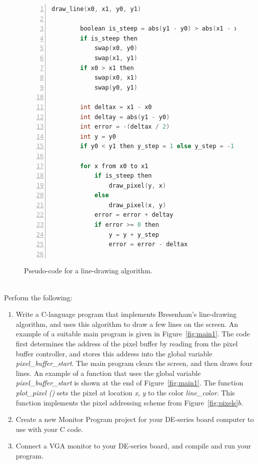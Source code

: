 \documentclass[epsfig,10pt,fullpage]{article}
\begin{document}
\begin{figure}[H]
\centering
\begin{lstlisting}[language=C, numbers=left, stepnumber=1, xleftmargin=1cm,
morekeywords={then}]
  draw_line(x0, x1, y0, y1)
		
		boolean is_steep = abs(y1 - y0) > abs(x1 - x0)
		if is_steep then
			swap(x0, y0)
			swap(x1, y1)
		if x0 > x1 then
			swap(x0, x1)
			swap(y0, y1)
			
		int deltax = x1 - x0
		int deltay = abs(y1 - y0)
		int error = -(deltax / 2)
		int y = y0
		if y0 < y1 then y_step = 1 else y_step = -1
		
		for x from x0 to x1
			if is_steep then 
				draw_pixel(y, x)
			else 
				draw_pixel(x, y)
			error = error + deltay
			if error >= 0 then
				y = y + y_step
				error = error - deltax
			
\end{lstlisting}
\caption{Pseudo-code for a line-drawing algorithm.}
\label{fig:line_algorithm}
\end{figure}

~\\
\noindent
Perform the following:

\begin{enumerate}

\item Write a C-language program that implements Bresenham's line-drawing algorithm,
and uses this algorithm to draw a few lines on the screen.  An example of a suitable main 
program is given in Figure~\ref{fig:main1}. The code first determines the address of the 
pixel buffer by reading from the pixel buffer controller, and stores this address into the
global variable {\it pixel\_buffer\_start}. The main program clears the screen, and then 
draws four lines.  An example of a function that uses the global variable 
{\it pixel\_buffer\_start} is shown at the end of Figure~\ref{fig:main1}. The function 
{\it plot\_pixel ()} sets the pixel at location {\it x}, {\it y} to the color {\it line\_color}. 
This function implements the pixel addressing scheme from Figure~\ref{fig:pixels}$b$.

\item Create a new Monitor Program project for your DE-series board computer to use 
		  with your C code.

\item Connect a VGA monitor to your DE-series board, and compile and run your program.
\end{enumerate}
\end{document}
